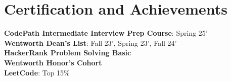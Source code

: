 \documentclass[letterpaper,11pt]{article}
\begin{document}
\section{Certification and Achievements}
\begin{itemize}[leftmargin=0.15in, label={}]
    \small{\item{
     \textbf{CodePath Intermediate Interview Prep Course}{: Spring 25'}\\
     \textbf{Wentworth Dean's List}{: Fall 23', Spring 23', Fall 24'} \\
     \textbf{HackerRank Problem Solving Basic}\\
     \textbf{Wentworth Honor's Cohort}\\
     \textbf{LeetCode}{: Top 15\%} }}\\
 \end{itemize}
\end{document}
